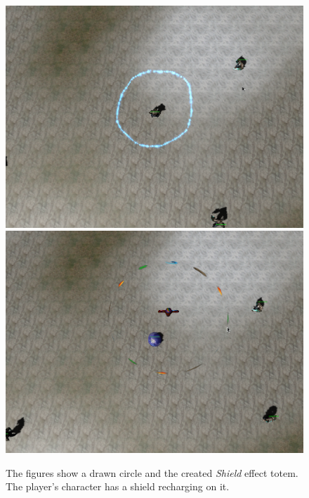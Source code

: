 \begin{figure}[p]
\centering
\includegraphics[width=.9\linewidth]{ext/scr/circle.png}
\quad
\includegraphics[width=.9\linewidth]{ext/scr/circlee.png}
\caption{The figures show a drawn circle and the created \emph{Shield} effect totem. The player's character has a shield recharging on it. }
\label{fig:spell:circle}
\end{figure}

